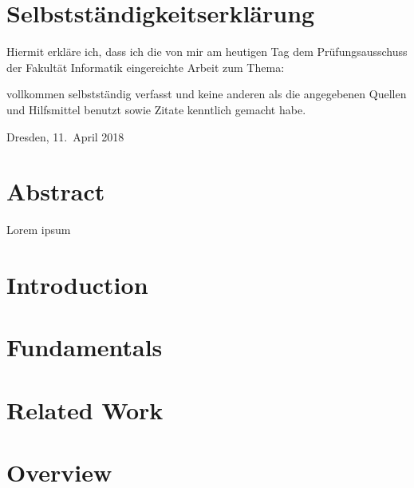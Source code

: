 \documentclass[
	paper=a4,
	fontsize=11pt,
	parskip=full %
]{scrreprt}
\begin{document}
	\chapter*{Selbstständigkeitserklärung}
	Hiermit erkläre ich, dass ich die von mir am heutigen Tag dem Prüfungsausschuss der Fakultät Informatik eingereichte Arbeit zum Thema:
	\begin{center}
		\textit{\thetitle} 
	\end{center}
	
	vollkommen selbstständig verfasst und keine anderen als die angegebenen Quellen und Hilfsmittel benutzt sowie Zitate kenntlich gemacht habe.
	
	Dresden, 11.\ April 2018 \\ %
	\theauthor
	
	
	\chapter*{Abstract}
    Lorem ipsum
	
	\tableofcontents
	
	
	\listoftables
	\vspace{-2.6\baselineskip}
	\begingroup
	\let\clearpage\relax
	\listoffigures
	\endgroup
	
	
	\chapter{Introduction}\label{ch:introduction}
    
    
    \chapter{Fundamentals}\label{ch:fundamentals}
    

    \chapter{Related Work}\label{ch:relatedwork}
    

    \chapter{Overview}\label{ch:overview}
    
\end{document}
